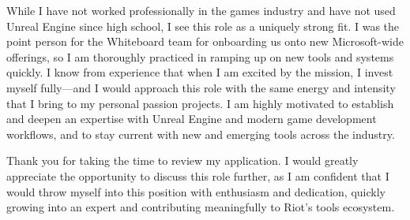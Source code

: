 \documentclass[10pt,a4paper,sans]{moderncv}
\begin{document}
While I have not worked professionally in the games industry and have not used Unreal Engine since high school, I see this role as a uniquely strong fit. I was the point person for the Whiteboard team for onboarding us onto new Microsoft-wide offerings, so I am thoroughly practiced in ramping up on new tools and systems quickly.  I know from experience that when I am excited by the mission, I invest myself fully—and I would approach this role with the same energy and intensity that I bring to my personal passion projects. I am highly motivated to establish and deepen an expertise with Unreal Engine and modern game development workflows, and to stay current with new and emerging tools across the industry.

Thank you for taking the time to review my application. I would greatly appreciate the opportunity to discuss this role further, as I am confident that I would throw myself into this position with enthusiasm and dedication, quickly growing into an expert and contributing meaningfully to Riot’s tools ecosystem.

\makeletterclosing
\end{document}
